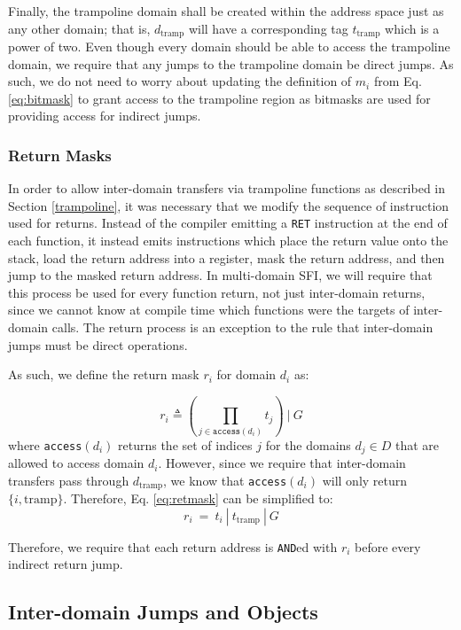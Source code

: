 \documentclass[12pt]{article}
\begin{document}
Finally, the trampoline domain shall be created within the address space just as any other domain; that is, $d_\text{tramp}$ will have a corresponding tag $t_\text{tramp}$ which is a power of two. Even though every domain should be able to access the trampoline domain, we require that any jumps to the trampoline domain be direct jumps. As such, we do not need to worry about updating the definition of $m_i$ from Eq. \ref{eq:bitmask} to grant access to the trampoline region as bitmasks are used for providing access for indirect jumps.


\subsubsection{Return Masks} \label{retmasks}

In order to allow inter-domain transfers via trampoline functions as described in Section \ref{trampoline}, it was necessary that we modify the sequence of instruction used for returns. Instead of the compiler emitting a \texttt{RET} instruction at the end of each function, it instead emits instructions which place the return value onto the stack, load the return address into a register, mask the return address, and then jump to the masked return address. In multi-domain SFI, we will require that this process be used for every function return, not just inter-domain returns, since we cannot know at compile time which functions were the targets of inter-domain calls. The return process is an exception to the rule that inter-domain jumps must be direct operations.

As such, we define the return mask $r_i$ for domain $d_i$ as:

\begin{equation} \label{eq:retmask}
r_i \triangleq (\prod_{j\in\texttt{access}(d_i)}t_j)\ |\ G
\end{equation}
where \texttt{access}$(d_i)$ returns the set of indices $j$ for the domains $d_j\in D$ that are allowed to access domain $d_i$. However, since we require that inter-domain transfers pass through $d_\text{tramp}$, we know that \texttt{access}$(d_i)$ will only return $\{i,\text{tramp}\}$. Therefore, Eq. \ref{eq:retmask} can be simplified to:
$$ r_i\ =\ t_i\ |\ t_\text{tramp}\ |\ G $$

Therefore, we require that each return address is \texttt{AND}ed with $r_i$ before every indirect return jump.

\subsection{Inter-domain Jumps and Objects}
\end{document}
